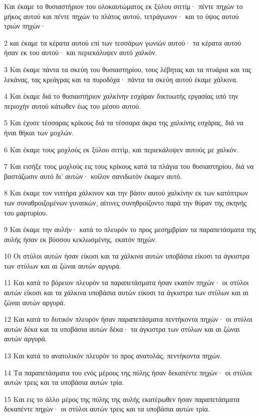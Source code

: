 \par Και έκαμε το θυσιαστήριον του ολοκαυτώματος εκ ξύλου σιττίμ· πέντε πηχών το μήκος αυτού και πέντε πηχών το πλάτος αυτού, τετράγωνον· και το ύψος αυτού τριών πηχών·
\par 2 και έκαμε τα κέρατα αυτού επί των τεσσάρων γωνιών αυτού· τα κέρατα αυτού ήσαν εκ του αυτού· και περιεκάλυψεν αυτό χαλκόν.
\par 3 Και έκαμε πάντα τα σκεύη του θυσιαστηρίου, τους λέβητας και τα πτυάρια και τας λεκάνας, τας κρεάγρας και τα πυροδόχα· πάντα τα σκεύη αυτού έκαμε χάλκινα.
\par 4 Και έκαμε διά το θυσιαστήριον χαλκίνην εσχάραν δικτυωτής εργασίας υπό την περιοχήν αυτού κάτωθεν έως του μέσου αυτού.
\par 5 Και έχυσε τέσσαρας κρίκους διά τα τέσσαρα άκρα της χαλκίνης εσχάρας, διά να ήναι θήκαι των μοχλών.
\par 6 Και έκαμε τους μοχλούς εκ ξύλου σιττίμ, και περιεκάλυψεν αυτούς με χαλκόν.
\par 7 Και εισήξε τους μοχλούς εις τους κρίκους κατά τα πλάγια του θυσιαστηρίου, διά να βαστάζωσιν αυτό δι' αυτών· κοίλον σανιδωτόν έκαμεν αυτό.
\par 8 Και έκαμε τον νιπτήρα χάλκινον και την βάσιν αυτού χαλκίνην εκ των κατόπτρων των συναθροιζομένων γυναικών, αίτινες συνηθροίζοντο παρά την θύραν της σκηνής του μαρτυρίου.
\par 9 Και έκαμε την αυλήν· κατά το πλευρόν το προς μεσημβρίαν τα παραπετάσματα της αυλής ήσαν εκ βύσσου κεκλωσμένης, εκατόν πηχών.
\par 10 Οι στύλοι αυτών ήσαν είκοσι και τα χάλκινα αυτών υποβάσια είκοσι τα άγκιστρα των στύλων και αι ζώναι αυτών αργυρά.
\par 11 Και κατά το βόρειον πλευρόν τα παραπετάσματα ήσαν εκατόν πηχών· οι στύλοι αυτών είκοσι και τα χάλκινα υποβάσια αυτών είκοσι τα άγκιστρα των στύλων και αι ζώναι αυτών αργυρά.
\par 12 Και κατά το δυτικόν πλευρόν ήσαν παραπετάσματα πεντήκοντα πηχών· οι στύλοι αυτών δέκα και τα υποβάσια αυτών δέκα· τα άγκιστρα των στύλων και αι ζώναι αυτών αργυρά.
\par 13 Και κατά το ανατολικόν πλευρόν το προς ανατολάς, πεντήκοντα πηχών.
\par 14 Τα παραπετάσματα του ενός μέρους της πύλης ήσαν δεκαπέντε πηχών· οι στύλοι αυτών τρεις και τα υποβάσια αυτών τρία.
\par 15 Και εις το άλλο μέρος της πύλης της αυλής εκατέρωθεν ήσαν παραπετάσματα δεκαπέντε πηχών· οι στύλοι αυτών τρεις και τα υποβάσια αυτών τρία.
